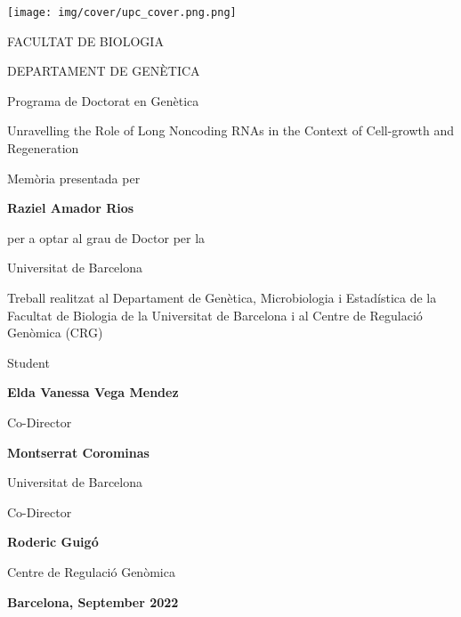 \begin{titlepage}

\begin{center}
\texttt{[image: img/cover/upc\_cover.png.png]}
  
\vspace*{1ex}
FACULTAT DE BIOLOGIA

DEPARTAMENT DE GENÈTICA

Programa de Doctorat en Genètica

\vspace*{2ex}

{\huge\mdseries Unravelling the Role of Long Noncoding RNAs in the Context of Cell-growth and Regeneration\par}
\vspace*{2ex}

Memòria presentada per    

\textbf{Raziel Amador Rios}

per a optar al grau de Doctor per la

Universitat de Barcelona

\vspace*{3ex}
Treball realitzat al Departament de Genètica, Microbiologia i Estadística de la Facultat de Biologia de la Universitat de Barcelona i al Centre de Regulació Genòmica (CRG)

\vfill
\begin{minipage}[b]{1\linewidth}\centering
Student
  
\textbf{Elda Vanessa Vega Mendez}
\end{minipage}
\end{center}

\vspace*{5ex}
\begin{minipage}[b]{0.45\linewidth}\centering
Co-Director
  
\textbf{Montserrat Corominas}

Universitat de Barcelona
\end{minipage}
\hfill
\begin{minipage}[b]{0.45\linewidth}\centering

Co-Director

\textbf{Roderic Guigó}

Centre de Regulació Genòmica
\end{minipage}
\vspace*{2ex}

\begin{center}
\textbf{Barcelona, September 2022}
\end{center}

\end{titlepage}

